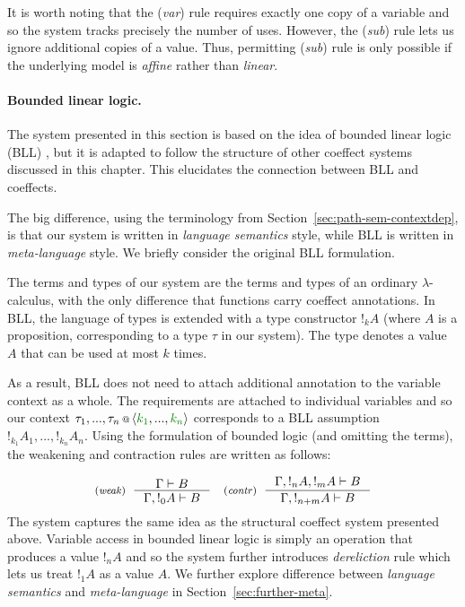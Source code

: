 It is worth noting that the (\emph{var}) rule requires exactly one copy of a variable and so
the system tracks precisely the number of uses. However, the (\emph{sub}) rule lets us
ignore additional copies of a value. Thus, permitting (\emph{sub}) rule is only possible if the
underlying model is \emph{affine} rather than \emph{linear}.

\paragraph{Bounded linear logic.}
The system presented in this section is based on the idea of bounded linear logic (BLL)
\cite{logic-bounded}, but it is adapted to follow the structure of other coeffect systems
discussed in this chapter. This elucidates the connection between BLL and coeffects.

The big difference, using the terminology from Section~\ref{sec:path-sem-contextdep}, is
that our system is written in \emph{language semantics} style, while BLL is written
in \emph{meta-language} style. We briefly consider the original BLL formulation.

The terms and types of our system are the terms and types of an ordinary $\lambda$-calculus,
with the only difference that functions carry coeffect annotations. In BLL, the language of
types is extended with a type constructor $!_k A$ (where $A$ is a proposition, corresponding
to a type $\tau$ in our system). The type denotes a value $A$ that can be used at most $k$ times.

As a result, BLL does not need to attach additional annotation to the variable context
as a whole. The requirements are attached to individual variables and so our context
$\coctx{\tau_1, ..., \tau_n}{\langle \cclrd{k_1}, ..., \cclrd{k_n}\rangle}$ corresponds
to a BLL assumption $!_{k_1} A_1, ..., !_{k_n} A_n$. Using the formulation of bounded logic
(and omitting the terms), the weakening and contraction rules are written as follows:

\[
\tyrule{weak}
  {\Gamma \vdash B}
  {\Gamma, !_0 A \vdash B}
\quad
\tyrule{contr}
  {\Gamma, !_n A, !_m A \vdash B}
  {\Gamma, !_{n+m} A \vdash B}
\]
%
The system captures the same idea as the structural coeffect system presented above.
Variable access in bounded linear logic is simply an operation that produces a value
$!_n A$ and so the system further introduces \emph{dereliction} rule which lets us
treat $!_1 A$ as a value $A$. We further explore difference between \emph{language
semantics} and \emph{meta-language} in Section~\ref{sec:further-meta}.

